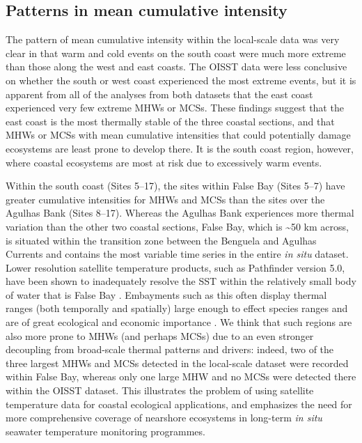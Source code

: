 \documentclass[a4paper,10pt,review]{elsarticle}
\begin{document}
\subsection{Patterns in mean cumulative intensity}
The pattern of mean cumulative intensity within the local-scale data was very clear in that warm and cold events on the south coast were much more extreme than those along the west and east coasts. The OISST data were less conclusive on whether the south or west coast experienced the most extreme events, but it is apparent from all of the analyses from both datasets that the east coast experienced very few extreme MHWs or MCSs. These findings suggest that the east coast is the most thermally stable of the three coastal sections, and that MHWs or MCSs with mean cumulative intensities that could potentially damage ecosystems are least prone to develop there. It is the south coast region, however, where coastal ecosystems are most at risk due to excessively warm events.

Within the south coast (Sites 5--17), the sites within False Bay (Sites 5--7) have greater cumulative intensities for MHWs and MCSs than the sites over the Agulhas Bank (Sites 8--17). Whereas the Agulhas Bank experiences more thermal variation than the other two coastal sections, False Bay, which is \textasciitilde50 km across, is situated within the transition zone between the Benguela and Agulhas Currents \citep{Smit2013} and contains the most variable time series in the entire \emph{in situ} dataset. Lower resolution satellite temperature products, such as Pathfinder version 5.0, have been shown to inadequately resolve the SST within the relatively small body of water that is False Bay \citep{Dufois2012}. Embayments such as this often display thermal ranges (both temporally and spatially) large enough to effect species ranges \citep{Ling2009} and are of great ecological \citep{Klumb2003} and economic importance \citep{Lugendo2005}. We think that such regions are also more prone to MHWs (and perhaps MCSs) due to an even stronger decoupling from broad-scale thermal patterns and drivers: indeed, two of the three largest MHWs and MCSs detected in the local-scale dataset were recorded within False Bay, whereas only one large MHW and no MCSs were detected there within the OISST dataset. This illustrates the problem of using satellite temperature data for coastal ecological applications, and emphasizes the need for more comprehensive coverage of nearshore ecosystems in long-term \emph{in situ} seawater temperature monitoring programmes.
\end{document}
